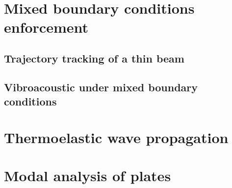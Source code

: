 \section{Mixed boundary conditions enforcement}\label{sec:mixbd_enfor}

\subsection{Trajectory tracking of a thin beam}

\subsection{Vibroacoustic under mixed boundary conditions}

\section{Thermoelastic wave propagation}\label{sec:thelas_wave}

\section{Modal analysis of plates}